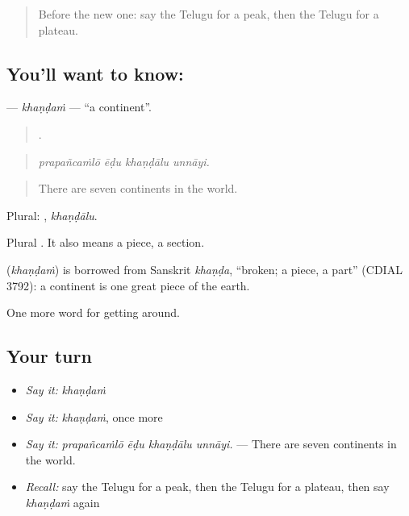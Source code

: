 \label{lesson:TE-C474-khandam}



\begin{quote}
Before the new one: say the Telugu for a peak, then the Telugu for a plateau.
\end{quote}

\subsection*{You'll want to know: }
\textbf{} — \emph{khaṇḍaṁ} — \textquotedblleft{}a continent\textquotedblright{}.

\begin{quote}
   .
\end{quote}

\begin{quote}
\emph{prapañcaṁlō ēḍu khaṇḍālu unnāyi.}
\end{quote}

\begin{quote}
There are seven continents in the world.
\end{quote}

Plural: , \emph{khaṇḍālu}.

Plural . It also means a piece, a section.

\begin{cousinweb}
\textbf{} (\emph{khaṇḍaṁ}) is borrowed from Sanskrit \emph{khaṇḍa}, \textquotedblleft{}broken; a piece, a part\textquotedblright{} (CDIAL 3792): a continent is one great piece of the earth.
\end{cousinweb}

\begin{grammarlens}[title={What you've built}]
One more word for getting around.
\end{grammarlens}

\subsection*{Your turn}
\begin{itemize}
\raggedright
  \item \emph{Say it:} \emph{khaṇḍaṁ}
  \item \emph{Say it:} \emph{khaṇḍaṁ}, once more
  \item \emph{Say it:} \emph{prapañcaṁlō ēḍu khaṇḍālu unnāyi.} — There are seven continents in the world.
  \item \emph{Recall:} say the Telugu for a peak, then the Telugu for a plateau, then say \emph{khaṇḍaṁ} again
\end{itemize}


